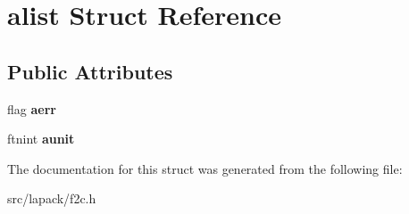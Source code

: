 \hypertarget{structalist}{\section{alist \-Struct \-Reference}
\label{structalist}
}
\subsection*{\-Public \-Attributes}
\begin{DoxyCompactItemize}
\item 
\hypertarget{structalist_af470841413f5853794fa9830d1e71ecd}{flag {\bfseries aerr}}\label{structalist_af470841413f5853794fa9830d1e71ecd}

\item 
\hypertarget{structalist_a02749fb381f7642c1d5d01902817f673}{ftnint {\bfseries aunit}}\label{structalist_a02749fb381f7642c1d5d01902817f673}

\end{DoxyCompactItemize}


\-The documentation for this struct was generated from the following file\-:\begin{DoxyCompactItemize}
\item 
src/lapack/f2c.\-h\end{DoxyCompactItemize}
